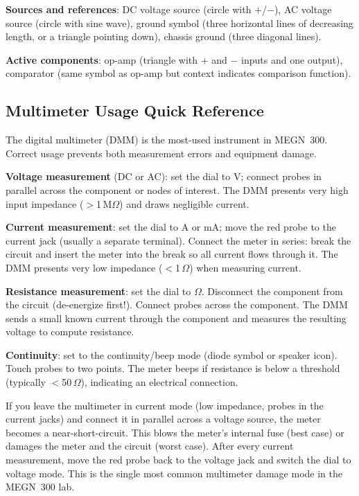 \documentclass[11pt,letterpaper,twoside,openany]{book}
\begin{document}
\textbf{Sources and references}: DC voltage source (circle with $+$/$-$), AC voltage source (circle with sine wave), ground symbol (three horizontal lines of decreasing length, or a triangle pointing down), chassis ground (three diagonal lines).

\textbf{Active components}: op-amp (triangle with $+$ and $-$ inputs and one output), comparator (same symbol as op-amp but context indicates comparison function).

\subsection{Multimeter Usage Quick Reference}
The digital multimeter (DMM) is the most-used instrument in MEGN~300. Correct usage prevents both measurement errors and equipment damage.

\textbf{Voltage measurement} (DC or AC): set the dial to V; connect probes in parallel across the component or nodes of interest. The DMM presents very high input impedance ($>$1\,M$\Omega$) and draws negligible current.

\textbf{Current measurement}: set the dial to A or mA; move the red probe to the current jack (usually a separate terminal). Connect the meter in series: break the circuit and insert the meter into the break so all current flows through it. The DMM presents very low impedance ($<$1\,$\Omega$) when measuring current.

\textbf{Resistance measurement}: set the dial to $\Omega$. Disconnect the component from the circuit (de-energize first!). Connect probes across the component. The DMM sends a small known current through the component and measures the resulting voltage to compute resistance.

\textbf{Continuity}: set to the continuity/beep mode (diode symbol or speaker icon). Touch probes to two points. The meter beeps if resistance is below a threshold (typically $<$50\,$\Omega$), indicating an electrical connection.

\begin{warningbox}
If you leave the multimeter in current mode (low impedance, probes in the current jacks) and connect it in parallel across a voltage source, the meter becomes a near-short-circuit. This blows the meter's internal fuse (best case) or damages the meter and the circuit (worst case). After every current measurement, move the red probe back to the voltage jack and switch the dial to voltage mode. This is the single most common multimeter damage mode in the MEGN~300 lab.
\end{warningbox}
\end{document}
